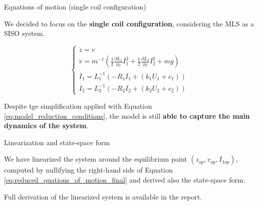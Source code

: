 \begin{frame}{Equations of motion (single coil configuration)}

    We decided to focus on the \textbf{single coil configuration}, considering the MLS as a SISO system.

    \begin{equation}
        \begin{cases}
            \dot{z} = v                                                                                                                                 \\
            \dot{v} = m^{-1} \left(\frac{1}{2} \frac{\partial L_1}{\partial z} I_1^2 + \frac{1}{2} \frac{\partial L_2}{\partial z} I_2^2 + m g  \right) \\
            \dot{I_1} = L_1^{-1} \left(- R_1 I_1 + (k_1 U_1 + c_1) \right)                                                                              \\
            \dot{I_2} = L_2^{-1} \left(- R_2 I_2 + (k_2 U_2 + c_2) \right)
        \end{cases}
        \label{eq:reduced_quations_of_motion_final}
    \end{equation}

    Despite tge simplification applied with Equation \ref{eq:model_reduction_conditions}, the model is still \textbf{able to capture the main dynamics of the system}.

\end{frame}



\begin{frame}{Linearization and state-space form}

    We have linearized the system around the equilibrium point $(z_{op}, v_{op}, I_{1op})$, computed by nullifying the right-hand side of Equation \ref{eq:reduced_quations_of_motion_final} and derived also the state-space form.

    \vspace{9pt}

    Full derivation of the linearized system is available in the report.

\end{frame}

